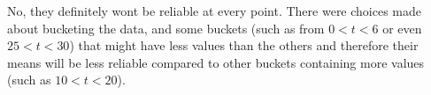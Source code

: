 \documentclass[12pt,twoside]{article}
\begin{document}
\begin{enumerate}
\begin{enumerate}
No, they definitely wont be reliable at every point. There were choices made about bucketing the data, and  some buckets (such as from $0 < t < 6$ or even $25 < t < 30$) that might have less values than the others and therefore their means will be less reliable compared to other buckets containing more values (such as $10 < t < 20$). 



\end{enumerate}


\end{enumerate}
\end{document}
